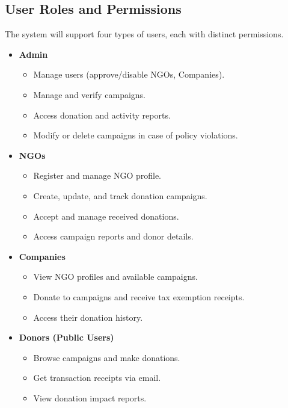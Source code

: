 \subsection{User Roles and Permissions}
The system will support four types of users, each with distinct permissions.

\begin{itemize}
    \item \textbf{Admin}
    \begin{itemize}
        \item Manage users (approve/disable NGOs, Companies).
        \item Manage and verify campaigns.
        \item Access donation and activity reports.
        \item Modify or delete campaigns in case of policy violations.
    \end{itemize}

    \item \textbf{NGOs}
    \begin{itemize}
        \item Register and manage NGO profile.
        \item Create, update, and track donation campaigns.
        \item Accept and manage received donations.
        \item Access campaign reports and donor details.
    \end{itemize}

    \item \textbf{Companies}
    \begin{itemize}
        \item View NGO profiles and available campaigns.
        \item Donate to campaigns and receive tax exemption receipts.
        \item Access their donation history.
    \end{itemize}

    \item \textbf{Donors (Public Users)}
    \begin{itemize}
        \item Browse campaigns and make donations.
        \item Get transaction receipts via email.
        \item View donation impact reports.
    \end{itemize}
\end{itemize}

